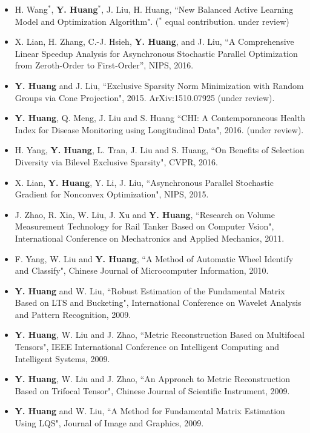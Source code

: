 \documentclass[11pt]{res} %
\begin{document}
\begin{resume}
\begin{itemize}
\item H. Wang$^*$, \textbf{Y. Huang}$^*$, J. Liu, H. Huang, ``New Balanced Active Learning Model and Optimization Algorithm". ($^*$ equal contribution. under review)
\item X. Lian, H. Zhang, C.-J. Hsieh, \textbf{Y. Huang}, and J. Liu, ``A Comprehensive Linear Speedup Analysis for Asynchronous Stochastic Parallel Optimization from Zeroth-Order to First-Order'', NIPS, 2016.
\item \textbf{Y. Huang} and J. Liu, ``Exclusive Sparsity Norm Minimization with Random Groups via Cone Projection", 2015. ArXiv:1510.07925 (under review).
\item \textbf{Y. Huang}, Q. Meng, J. Liu and S. Huang ``CHI: A Contemporaneous Health Index for Disease Monitoring using Longitudinal Data", 2016. (under review).
\item H. Yang, \textbf{Y. Huang}, L. Tran, J. Liu and S. Huang, ``On Benefits of Selection Diversity via Bilevel Exclusive Sparsity", CVPR, 2016.
\item X. Lian, \textbf{Y. Huang}, Y. Li, J. Liu, ``Asynchronous Parallel Stochastic Gradient for Nonconvex Optimization", NIPS, 2015.
\item J. Zhao, R. Xia, W. Liu, J. Xu and \textbf{Y. Huang}, ``Research on Volume Measurement Technology for Rail Tanker Based on Computer Vsion", International Conference on Mechatronics and Applied Mechanics, 2011. 
\item F. Yang, W. Liu and \textbf{Y. Huang}, ``A Method of Automatic Wheel Identify and Classify", Chinese Journal of Microcomputer Information, 2010. 
\item \textbf{Y. Huang} and W. Liu, ``Robust Estimation of the Fundamental Matrix Based on LTS and Bucketing", International Conference on Wavelet Analysis and Pattern Recognition, 2009.
\item \textbf{Y. Huang}, W. Liu and J. Zhao, ``Metric Reconstruction Based on Multifocal Tensors", IEEE International Conference on Intelligent Computing and Intelligent Systems, 2009. 
\item \textbf{Y. Huang}, W. Liu and J. Zhao, ``An Approach to Metric Reconstruction Based on Trifocal Tensor", Chinese Journal of Scientific Instrument, 2009. 
\item \textbf{Y. Huang} and W. Liu, ``A Method for Fundamental Matrix Estimation Using LQS", Journal of Image and Graphics, 2009. 
\end{itemize}

\vspace{0.2in} %


\end{resume}
\end{document}
